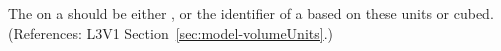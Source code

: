 The  on a \Model should be either ,
 or the identifier of a \UnitDefinition based
on these units or  cubed.  (References: 
L3V1 Section~\ref{sec:model-volumeUnits}.)
